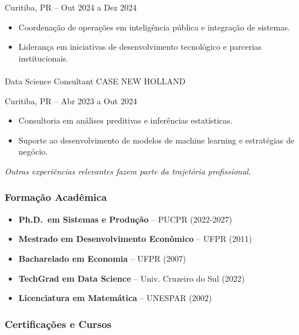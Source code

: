 \documentclass[
  letterpaper,
  DIV=11,
  numbers=noendperiod]{scrartcl}
\makeatletter
\let\oldparagraph\paragraph
\renewcommand{\paragraph}{
    \@ifstar
      \xxxParagraphStar
      \xxxParagraphNoStar
  }
\newcommand{\xxxParagraphStar}[1]{\oldparagraph*{#1}\mbox{}}
\newcommand{\xxxParagraphNoStar}[1]{\oldparagraph{#1}\mbox{}}
\providecommand{\tightlist}{%
  \setlength{\itemsep}{0pt}\setlength{\parskip}{0pt}}\usepackage{longtable,booktabs,array}
\makeatother
\begin{document}
{Curitiba, PR -- Out 2024 a Dez 2024}

\begin{itemize}
\tightlist
\item
  Coordenação de operações em inteligência pública e integração de
  sistemas.
\item
  Liderança em iniciativas de desenvolvimento tecnológico e parcerias
  institucionais.
\end{itemize}

\paragraph{Data Science Consultant \textbar{} CASE NEW
HOLLAND}\label{data-science-consultant-case-new-holland}

{Curitiba, PR -- Abr 2023 a Out 2024}

\begin{itemize}
\tightlist
\item
  Consultoria em análises preditivas e inferências estatísticas.
\item
  Suporte ao desenvolvimento de modelos de machine learning e
  estratégias de negócio.
\end{itemize}

\emph{Outras experiências relevantes fazem parte da trajetória
profissional.}

\subsubsection{Formação Acadêmica}\label{formauxe7uxe3o-acaduxeamica}

\begin{itemize}
\tightlist
\item
  \textbf{Ph.D.~em Sistemas e Produção} -- PUCPR (2022-2027)
\item
  \textbf{Mestrado em Desenvolvimento Econômico} -- UFPR (2011)
\item
  \textbf{Bacharelado em Economia} -- UFPR (2007)
\item
  \textbf{TechGrad em Data Science} -- Univ. Cruzeiro do Sul (2022)
\item
  \textbf{Licenciatura em Matemática} -- UNESPAR (2002)
\end{itemize}

\subsubsection{Certificações e
Cursos}\label{certificauxe7uxf5es-e-cursos}
\end{document}
